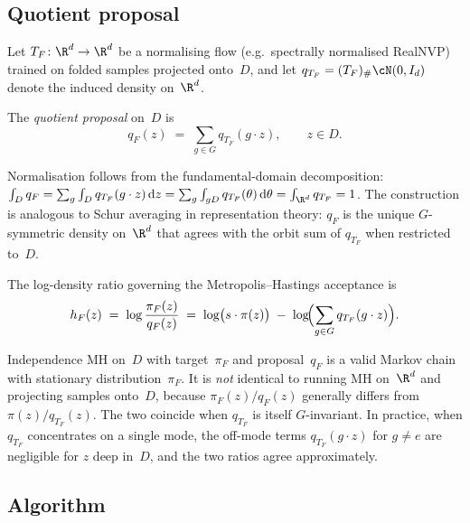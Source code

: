 \subsection{Quotient proposal}
\label{sec:quotient_proposal}

Let $T_F\colon \R^d \to \R^d$ be a normalising flow
(e.g.\ spectrally normalised RealNVP) trained on folded samples
projected onto~$D$, and let
$q_{T_F} = (T_F)_{\#}\cN(0, I_d)$ denote the induced density
on~$\R^d$.

\begin{definition}\label{def:quotient_proposal}
  The \emph{quotient proposal} on~$D$ is
  \begin{equation}\label{eq:q_F}
    q_F(z) \;=\; \sum_{g \in G} q_{T_F}(g \cdot z), \qquad z \in D.
  \end{equation}
\end{definition}

\noindent
Normalisation follows from the fundamental-domain decomposition:
$\int_D q_F = \sum_g \int_D q_{T_F}(g \cdot z)\,\mathrm{d}z
= \sum_g \int_{gD} q_{T_F}(\theta)\,\mathrm{d}\theta
= \int_{\R^d} q_{T_F} = 1$.
The construction is analogous to Schur averaging in representation
theory: $q_F$ is the unique $G$-symmetric density on~$\R^d$
that agrees with the orbit sum of $q_{T_F}$ when restricted to~$D$.

The log-density ratio governing the Metropolis--Hastings
acceptance is
\begin{equation}\label{eq:h_F}
  h_F(z)
  \;=\; \log\frac{\pi_F(z)}{q_F(z)}
  \;=\; \log\bigl(s \cdot \pi(z)\bigr)
  \;-\; \log\!\Bigl(\sum_{g \in G} q_{T_F}(g \cdot z)\Bigr).
\end{equation}

\begin{remark}\label{rem:not_equivalent}
  Independence MH on~$D$ with target~$\pi_F$ and proposal~$q_F$ is
  a valid Markov chain with stationary distribution~$\pi_F$.  It is
  \emph{not} identical to running MH on~$\R^d$ and projecting
  samples onto~$D$, because $\pi_F(z)/q_F(z)$ generally differs from
  $\pi(z)/q_{T_F}(z)$.  The two coincide when $q_{T_F}$ is itself
  $G$-invariant.  In practice, when $q_{T_F}$ concentrates on a single
  mode, the off-mode terms $q_{T_F}(g \cdot z)$ for $g \neq e$ are
  negligible for $z$ deep in~$D$, and the two ratios agree
  approximately.
\end{remark}


\subsection{Algorithm}
\label{sec:algorithm}

